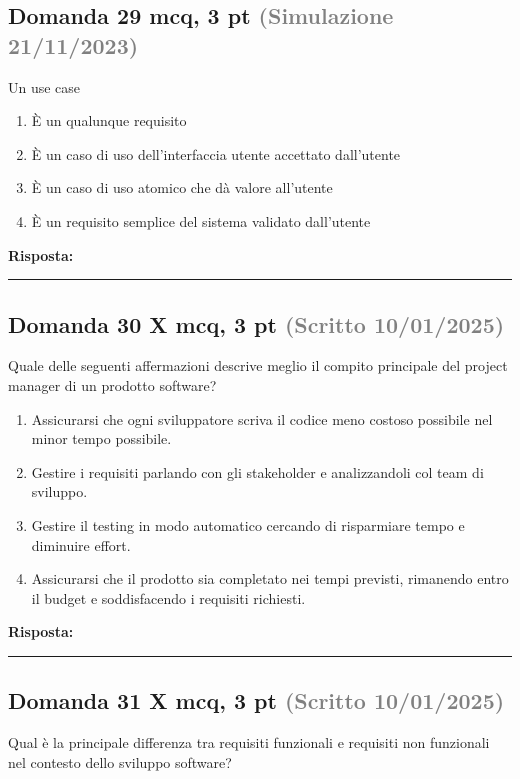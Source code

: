 \documentclass[a4paper,11pt]{article}
\begin{document}
\subsection*{Domanda 29 \hfill {\small mcq, 3 pt \textcolor{gray}{(Simulazione 21/11/2023)}}}
Un use case

\begin{enumerate}[label=\alph*)]
\item È un qualunque requisito
\item È un caso di uso dell'interfaccia utente accettato dall'utente
\item È un caso di uso atomico che dà valore all'utente
\item È un requisito semplice del sistema validato dall'utente
\end{enumerate}
\vspace{0.2cm}
\noindent\textbf{Risposta:}\par
\vspace{1.5cm}\hrule


\subsection*{Domanda 30 X \hfill {\small mcq, 3 pt \textcolor{gray}{(Scritto 10/01/2025)}}}
Quale delle seguenti affermazioni descrive meglio il compito principale del project manager di un prodotto software?

\begin{enumerate}[label=\alph*)]
\item Assicurarsi che ogni sviluppatore scriva il codice meno costoso possibile nel minor tempo possibile.
\item Gestire i requisiti parlando con gli stakeholder e analizzandoli col team di sviluppo.
\item Gestire il testing in modo automatico cercando di risparmiare tempo e diminuire effort.
\item Assicurarsi che il prodotto sia completato nei tempi previsti, rimanendo entro il budget e soddisfacendo i requisiti richiesti.
\end{enumerate}
\vspace{0.2cm}
\noindent\textbf{Risposta:}\par
\vspace{1.5cm}\hrule


\subsection*{Domanda 31 X \hfill {\small mcq, 3 pt \textcolor{gray}{(Scritto 10/01/2025)}}}
Qual è la principale differenza tra requisiti funzionali e requisiti non funzionali nel contesto dello sviluppo software?
\end{document}
